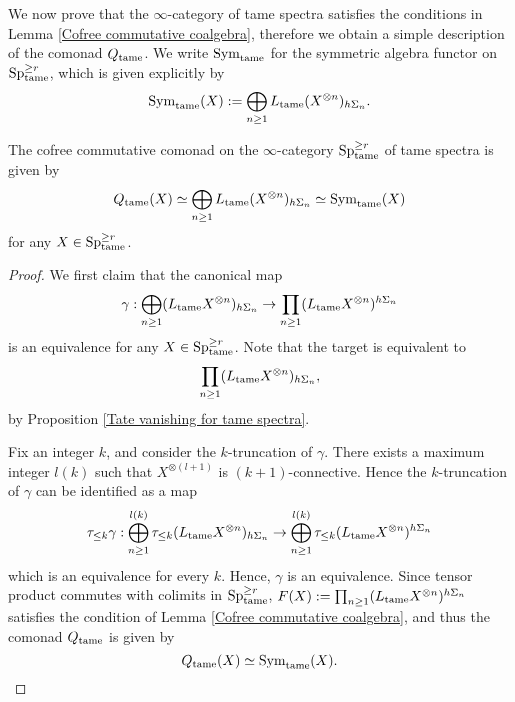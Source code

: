 We now prove that the $\infty$-category of tame spectra satisfies the conditions in Lemma
\ref{Cofree commutative coalgebra}, therefore we obtain a simple description of the comonad $Q_{\operatorname{\operatorname{tame}}}$.
We write $\operatorname{Sym}_{\operatorname{\operatorname{tame}}}$ for the symmetric algebra functor on $\operatorname{Sp}^{\geq r}_{\operatorname{\operatorname{tame}}}$, which is given explicitly by
$$
\operatorname{Sym}_{\operatorname{\operatorname{tame}}}(X) :=\bigoplus_{n\geq 1} L_{\operatorname{\operatorname{tame}}}(X^{\otimes n})_{h\Sigma_n} .
$$
\begin{proposition}
\label{Cofreee commutative comonad}
	The cofree commutative comonad on the $\infty$-category $\operatorname{Sp}^{\geq r}_{\operatorname{\operatorname{tame}}}$ of tame spectra is given by
	 $$
	 Q_{\operatorname{\operatorname{tame}}}(X) \simeq \bigoplus_{n\geq 1} L_{\operatorname{\operatorname{tame}}}(X^{\otimes n})_{h\Sigma_n}
	 \simeq
	 \operatorname{Sym}_{\operatorname{\operatorname{tame}}}(X)
	 $$
	 for any $X \in \operatorname{Sp}^{\geq r}_{\operatorname{\operatorname{tame}}}$.
\end{proposition}
\begin{proof}
We first claim that the canonical map 
    $$
	\gamma: \bigoplus_{n\geq 1} (L_{\operatorname{\operatorname{tame}}}X^{\otimes n})_{h\Sigma_n}
	\to 
	\prod_{n\geq 1} (L_{\operatorname{\operatorname{tame}}}X^{\otimes n})^{h\Sigma_n}
	$$
	is an equivalence for any $X \in \operatorname{Sp}^{\geq r}_{\operatorname{\operatorname{tame}}}$.
    Note that the target is equivalent to 
    $$
    \prod_{n\geq 1} (L_{\operatorname{\operatorname{tame}}} X^{\otimes n})_{h\Sigma_n},
    $$
    by Proposition \ref{Tate vanishing for tame spectra}.
    
	Fix an integer $k$, and consider the $k$-truncation of $\gamma$. There exists a maximum integer $l(k)$ such that $X^{\otimes (l+1)}$ is $(k+1)$-connective.
	Hence the $k$-truncation of $\gamma$ can be identified as a map
	$$
	\tau_{\leq k} \gamma: \bigoplus_{n\geq 1}^{l(k)}
	\tau_{\leq k} (L_{\operatorname{\operatorname{tame}}}X^{\otimes n})_{h\Sigma_n}
	\to 
	\bigoplus_{n\geq 1}^{l(k)}
	\tau_{\leq k} (L_{\operatorname{\operatorname{tame}}}X^{\otimes n})^{h\Sigma_n}
	$$
	 which is an equivalence for every $k$. Hence, $\gamma$ is an equivalence.
	 Since tensor product commutes with colimits in $\operatorname{Sp}^{\geq r}_{\operatorname{\operatorname{tame}}}$, $F(X):=\prod_{n\geq 1} (L_{\operatorname{\operatorname{tame}}} X^{\otimes n})^{h\Sigma_n}$ satisfies the condition of Lemma
    \ref{Cofree commutative coalgebra}, and thus the comonad $Q_{\operatorname{\operatorname{tame}}}$ is given by 
    $$
    Q_{\operatorname{\operatorname{tame}}}(X) \simeq  \operatorname{Sym}_{\operatorname{\operatorname{tame}}}(X).
    $$
	\end{proof}


